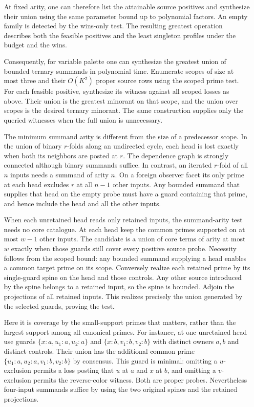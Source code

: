 At fixed arity, one can therefore list
the attainable source positives and
synthesize their union using the same
parameter bound up to polynomial factors.
An empty family is detected by the
wins-only test. The resulting greatest
operation describes both the feasible
positives and the least singleton
profiles under the budget and the wins.

Consequently, for variable palette one
can synthesize the greatest union of
bounded ternary summands in polynomial
time. Enumerate scopes of size at most
three and their $O(K^2)$ proper source
rows using the scoped prime test. For
each feasible positive, synthesize its
witness against all scoped losses as
above. Their union is the greatest
minorant on that scope, and the union
over scopes is the desired ternary
minorant. The same construction supplies
only the queried witnesses when the
full union is unnecessary.

The minimum summand arity is different from the size of
a predecessor scope. In the union of binary $r$-folds along
an undirected cycle, each head is lost exactly when both
its neighbors are posted at $r$. The dependence graph is
strongly connected although binary summands suffice. In
contrast, an iterated $r$-fold of all $n$ inputs needs a
summand of arity $n$. On a foreign observer facet its only
prime at each head excludes $r$ at all $n-1$ other inputs.
Any bounded summand that supplies that head on the empty
probe must have a guard containing that prime, and hence
include the head and all the other inputs.

When each unretained head reads only retained inputs, the
summand-arity test needs no core catalogue. At each head
keep the common primes supported on at most $w-1$ other
inputs. The candidate is a union of core terms of arity at
most $w$ exactly when those guards still cover every positive
source probe. Necessity follows from the scoped bound: any
bounded summand supplying a head enables a common target
prime on its scope. Conversely realize each retained prime
by its single-guard spine on the head and those controls.
Any other source introduced by the spine belongs to a retained
input, so the spine is bounded. Adjoin the projections of all
retained inputs. This realizes precisely the union generated
by the selected guards, proving the test.

Here it is coverage by the small-support primes that matters,
rather than the largest support among all canonical primes.
For instance, at one unretained head use guards
$\{x:a,u_1:a,u_2:a\}$ and $\{x:b,v_1:b,v_2:b\}$ with
distinct owners $a,b$ and distinct controls. Their union
has the additional common prime
$\{u_1:a,u_2:a,v_1:b,v_2:b\}$ by consensus. This guard is
minimal: omitting a $u$-exclusion permits a loss posting
that $u$ at $a$ and $x$ at $b$, and omitting a $v$-exclusion
permits the reverse-color witness. Both are proper probes.
Nevertheless four-input summands suffice by using the two
original spines and the retained projections.

